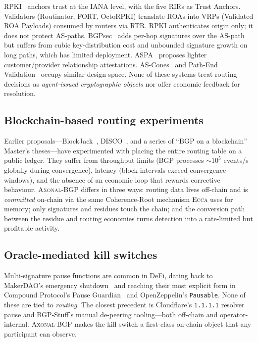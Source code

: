\documentclass[11pt,twocolumn]{article}
\theoremstyle{definition}
\theoremstyle{plain}
\theoremstyle{remark}
\newcommand{\ecca}{\textsc{Ecca}}
\newcommand{\axonal}{\textsc{Axonal-BGP}}
\newcommand{\code}[1]{\texttt{#1}}
\begin{document}
RPKI~\cite{rfc6480,rfc6810} anchors trust at the IANA level, with the five RIRs as Trust Anchors. Validators (Routinator, FORT, OctoRPKI) translate ROAs into VRPs (Validated ROA Payloads) consumed by routers via RTR. RPKI authenticates origin only; it does not protect AS-paths. BGPsec~\cite{rfc8205} adds per-hop signatures over the AS-path but suffers from cubic key-distribution cost and unbounded signature growth on long paths, which has limited deployment. ASPA~\cite{aspa2024} proposes lighter customer/provider relationship attestations. AS-Cones~\cite{snijders24} and Path-End Validation~\cite{cohen18} occupy similar design space. None of these systems treat routing decisions as \emph{agent-issued cryptographic objects} nor offer economic feedback for resolution.

\subsection{Blockchain-based routing experiments}

Earlier proposals---BlockJack~\cite{hari18}, DISCO~\cite{sermpezis20}, and a series of ``BGP on a blockchain'' Master's theses---have experimented with placing the entire routing table on a public ledger. They suffer from throughput limits (BGP processes ${\sim}10^{5}$ events/s globally during convergence), latency (block intervals exceed convergence windows), and the absence of an economic loop that rewards corrective behaviour. \axonal{} differs in three ways: routing data lives off-chain and is \emph{committed} on-chain via the same Coherence-Root mechanism \ecca{} uses for memory; only signatures and residues touch the chain; and the conversion path between the residue and routing economies turns detection into a rate-limited but profitable activity.

\subsection{Oracle-mediated kill switches}

Multi-signature pause functions are common in DeFi, dating back to MakerDAO's emergency shutdown~\cite{makerdao20} and reaching their most explicit form in Compound Protocol's Pause Guardian~\cite{compound19} and OpenZeppelin's \code{Pausable}. None of these are tied to \emph{routing}. The closest precedent is Cloudflare's \code{1.1.1.1} resolver pause and BGP-Stuff's manual de-peering tooling---both off-chain and operator-internal. \axonal{} makes the kill switch a first-class on-chain object that any participant can observe.
\end{document}
